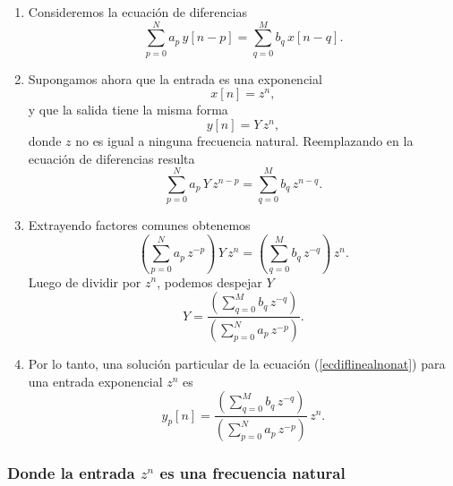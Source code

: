 \begin{enumerate}

\item Consideremos la ecuaci\'{o}n de diferencias
\begin{equation}
  \sum_{p=0}^{N}a_{p} \, y\left[ n-p\right] =
  \sum_{q=0}^{M}b_{q} \, x\left[ n-q\right]. \label{ecdiflinealnonat}
\end{equation}

\item Supongamos ahora que la entrada es una exponencial
\begin{equation}
  x\left[ n\right] = z^{n},
\end{equation}
y que la salida tiene la misma forma
\begin{equation}
  y\left[ n\right] = Y \, z^{n},
\end{equation}
donde $z$ no es igual a ninguna frecuencia natural. 
Reemplazando en la ecuaci\'{o}n de diferencias resulta 
\begin{equation}
  \sum_{p=0}^{N}a_{p} \, Y \, z^{n-p}=\sum_{q=0}^{M}b_{q} \, z^{n-q}.
\end{equation}

\item Extrayendo factores comunes obtenemos 
\begin{equation}
  \left( \sum_{p=0}^{N}a_{p} \, z^{-p}\right) \, Y \, z^{n}=
  \left(\sum_{q=0}^{M}b_{q} \, z^{-q}\right) \, z^{n}. \label{ecdifpart}
\end{equation}
Luego de dividir por $z^n$, podemos despejar $Y$
\begin{equation}
  Y=\frac{\left( \sum_{q=0}^{M}b_{q} \, z^{-q}\right) }{\left(\sum_{p=0}^{N}a_{p} \, z^{-p}\right) }.
\end{equation}

\item Por lo tanto, una soluci\'{o}n particular de la ecuaci\'{o}n (\ref{ecdiflinealnonat}) 
para una entrada exponencial $z^{n}$ es
\begin{equation}
  y_{p}[n] =
    \frac{\left( \sum_{q=0}^{M}b_{q} \, z^{-q}\right) }{\left(\sum_{p=0}^{N}a_{p} \, z^{-p}\right) } \, z^{n}.
    \label{eqhzorig}
\end{equation}

\end{enumerate}

\subsubsection{Donde la entrada $z^{n}$ es una frecuencia natural}

